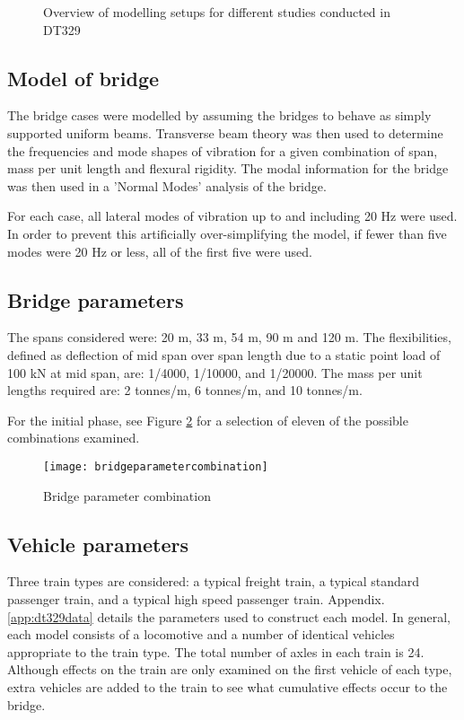 \begin{appendices}
\begin{figure}[h]
\begin{tikzpicture}
\end{tikzpicture}

\caption{Overview of modelling setups for different studies conducted in DT329 }
\label{fig:modelling overview}
\end{figure}


\subsection{Model of bridge}
The bridge cases were modelled by assuming the bridges to behave as simply supported uniform beams. Transverse beam theory was then used to determine the frequencies and mode shapes of vibration for a given combination of span, mass per unit length and flexural rigidity. The modal information for the bridge was then used in a 'Normal Modes' analysis of the bridge.

For each case, all lateral modes of vibration up to and including 20 Hz were used. In order to prevent this artificially over-simplifying the model, if fewer than five modes were 20 Hz or less, all of the first five were used.

\subsection{Bridge parameters}

The spans considered were: 20 m, 33 m, 54 m, 90 m and 120 m. The flexibilities, defined as deflection of mid span over span length due to a static point load of 100 kN at mid span, are: 1/4000, 1/10000, and 1/20000. The mass per unit lengths required are: 2 tonnes/m, 6 tonnes/m, and 10 tonnes/m.

For the initial phase, see Figure \ref{fig:bridgeparametercombination} for a selection of eleven of the possible combinations examined.

\begin{figure}[h]
    \centering
    \texttt{[image: bridgeparametercombination]}
    \caption{Bridge parameter combination}
    \label{fig:bridgeparametercombination}
\end{figure}

\subsection{Vehicle parameters}
Three train types are considered: a typical freight train, a typical standard passenger train, and a typical high speed passenger train. Appendix.\ref{app:dt329data} details the parameters used to construct each model. In general, each model consists of a locomotive and a number of identical vehicles appropriate to the train type. The total number of axles in each train is 24. Although effects on the train are only examined on the first vehicle of each type, extra vehicles are added to the train to see what cumulative effects occur to the bridge.


\end{appendices}
